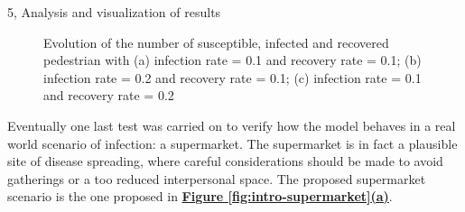 \documentclass[10pt,a4paper]{article}
\begin{document}
\begin{task}{5, Analysis and visualization of results}
\begin{figure}[H]
    \centering
    \vfill
    \vfill
    \caption{Evolution of the number of susceptible, infected and recovered pedestrian with
    (a) infection rate = 0.1 and recovery rate = 0.1;
    (b) infection rate = 0.2 and recovery rate = 0.1;
    (c) infection rate = 0.1 and recovery rate = 0.2}
    \label{fig:inf-rec-rates-plots}
\end{figure}

Eventually one last test was carried on to verify how the model behaves in a real world scenario of infection: a supermarket. The supermarket is in fact a plausible site of disease spreading, where careful considerations should be made to avoid gatherings or a too reduced interpersonal space. The proposed supermarket scenario is the one proposed in \textbf{\hyperref[fig:intro-supermarket]{Figure \ref{fig:intro-supermarket}(a)}}.


\end{task}
\end{document}
